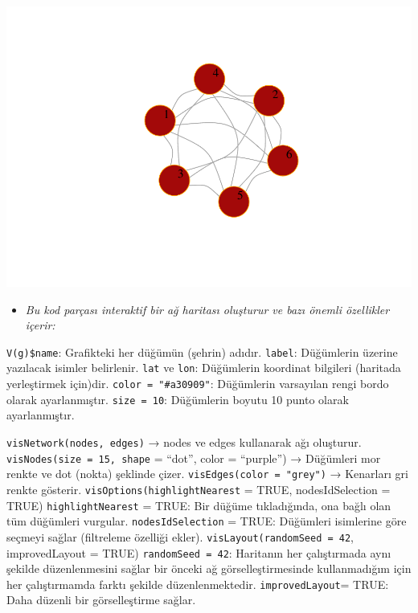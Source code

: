 \documentclass[
]{article}
\providecommand{\tightlist}{%
  \setlength{\itemsep}{0pt}\setlength{\parskip}{0pt}}
\begin{document}
\includegraphics{cigdem_ucar_Rmarkdown_odevi_files/figure-latex/unnamed-chunk-7-1.pdf}

\begin{itemize}
\tightlist
\item
  \emph{Bu kod parçası interaktif bir ağ haritası oluşturur ve bazı
  önemli özellikler içerir:}
\end{itemize}

\texttt{V(g)\$name}: Grafikteki her düğümün (şehrin) adıdır.
\texttt{label}: Düğümlerin üzerine yazılacak isimler belirlenir.
\texttt{lat} ve \texttt{lon}: Düğümlerin koordinat bilgileri (haritada
yerleştirmek için)dir. \texttt{color\ =\ "\#a30909"}: Düğümlerin
varsayılan rengi bordo olarak ayarlanmıştır. \texttt{size\ =\ 10}:
Düğümlerin boyutu 10 punto olarak ayarlanmıştır.

\texttt{visNetwork(nodes,\ edges)} → nodes ve edges kullanarak ağı
oluşturur. \texttt{visNodes(size\ =\ 15,\ shape} = ``dot'', color =
``purple'') → Düğümleri mor renkte ve dot (nokta) şeklinde çizer.
\texttt{visEdges(color\ =\ "grey")} → Kenarları gri renkte gösterir.
\texttt{visOptions(highlightNearest} = TRUE, nodesIdSelection = TRUE)
\texttt{highlightNearest} = TRUE: Bir düğüme tıkladığında, ona bağlı
olan tüm düğümleri vurgular. \texttt{nodesIdSelection} = TRUE: Düğümleri
isimlerine göre seçmeyi sağlar (filtreleme özelliği ekler).
\texttt{visLayout(randomSeed\ =\ 42}, improvedLayout = TRUE)
\texttt{randomSeed\ =\ 42}: Haritanın her çalıştırmada aynı şekilde
düzenlenmesini sağlar bir önceki ağ görselleştirmesinde kullanmadığım
için her çalıştırmamda farktı şekilde düzenlenmektedir.
\texttt{improvedLayout}= TRUE: Daha düzenli bir görselleştirme sağlar.
\end{document}
